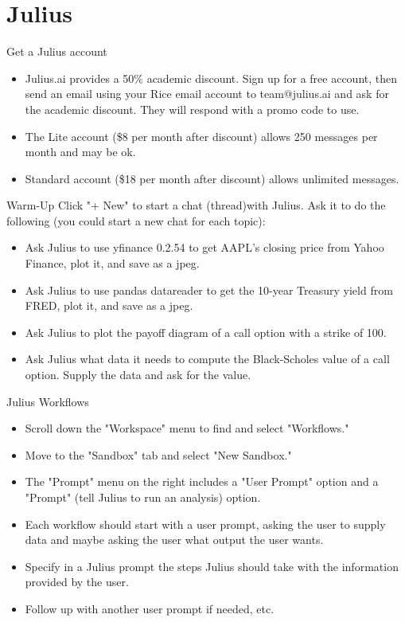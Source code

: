 \documentclass[10pt]{beamer}
\begin{document}
\section{Julius}
\begin{frame}{Get a Julius account}
\begin{itemize}
\item Julius.ai provides a 50\% academic discount. Sign up for a free account, then send an email using your Rice email account to team@julius.ai and ask for the academic discount. They will respond with a promo code to use.
\item The Lite account (\$8 per month after discount) allows 250 messages per month and may be ok.
\item Standard account (\$18 per month after discount) allows unlimited messages.
\end{itemize}
\end{frame}

\begin{frame}{Warm-Up}
  Click "+ New" to start a chat (thread)with Julius.  Ask it to do the following (you could start a new chat for each topic):
\begin{itemize}
\item Ask Julius to use yfinance 0.2.54 to get AAPL's closing price from Yahoo Finance, plot it, and save as a jpeg.
\item Ask Julius to use pandas datareader to get the 10-year Treasury yield from FRED, plot it, and save as a jpeg.
\item Ask Julius to plot the payoff diagram of a call option with a strike of 100.
\item Ask Julius what data it needs to compute the Black-Scholes value of a call option. Supply the data and ask for the value.
\end{itemize}
\end{frame}

\begin{frame}{Julius Workflows}
  \begin{itemize}
  \item Scroll down the "Workspace" menu to find and select "Workflows." 
  \item Move to the "Sandbox" tab and select "New Sandbox."
  \item The "Prompt" menu on the right includes a "User Prompt" option and a "Prompt" (tell Julius to run an analysis) option.
  \item Each workflow should start with a user prompt, asking the user to supply data and maybe asking the user what output the user wants.
  \item Specify in a Julius prompt the steps Julius should take with the information provided by the user.  
  \item Follow up with another user prompt if needed, etc.
  \end{itemize}
\end{frame}
\end{document}
